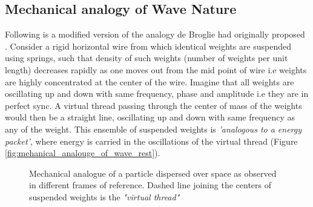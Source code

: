 \documentclass[11pt, a4paper]{article}
\begin{document}
\subsection{Mechanical analogy of Wave Nature} \label{sec:mechanical_analogy_to_wave_nature}
Following is a modified version of the analogy de Broglie had originally proposed \cite{de_broglie_thesis}. Consider a rigid horizontal wire from which identical weights are suspended using springs, such that density of such weights (number of weights per unit length) decreases rapidly as one moves out from the mid point of wire i.e weights are highly concentrated at the center of the wire. Imagine that all weights are oscillating up and down with same frequency, phase and amplitude i.e they are in perfect sync. A virtual thread passing through the center of mass of the weights would then be a straight line, oscillating up and down with same frequency as any of the weight. This ensemble of suspended weights is \textit{'analogous to a energy packet'}, where energy is carried in the oscillations of the virtual thread (Figure \ref{fig:mehanical_analouge_of_wave_rest}).
\begin{figure}
	\centering



	\caption{Mechanical analogue of a particle dispersed over space as observed in different frames of reference. Dashed line joining the centers of suspended weights is the \textit{"virtual thread"}}
	\label{fig:mehanical_analouge_of_wave}
\end{figure}
\end{document}
